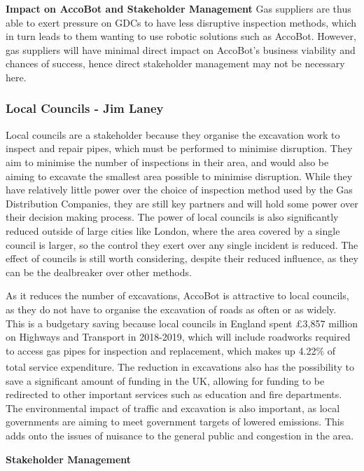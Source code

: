 \documentclass[11pt]{article}		%
\newcommand{\supercite}[1]{\textsuperscript{\cite{#1}}}		%
\begin{document}
		\textbf{Impact on AccoBot and Stakeholder Management}
		Gas suppliers are thus able to exert pressure on GDCs to have less disruptive inspection methods, which in turn leads to them wanting to use robotic solutions such as AccoBot. However, gas suppliers will have minimal direct impact on AccoBot’s business viability and chances of success, hence direct stakeholder management may not be necessary here. 
		
		\subsubsection[Local Councils]{Local Councils - Jim Laney}
			
			Local councils are a stakeholder because they organise the excavation work to inspect and repair pipes, which must be performed to minimise disruption.
			They aim to minimise the number of inspections in their area, and would also be aiming to excavate the smallest area possible to minimise disruption.
			While they have relatively little power over the choice of inspection method used by the Gas Distribution Companies, they are still key partners and will hold some power over their decision making process.
			The power of local councils is also significantly reduced outside of large cities like London, where the area covered by a single council is larger, so the control they exert over any single incident is reduced.
			The effect of councils is still worth considering, despite their reduced influence, as they can be the dealbreaker over other methods.
			
			As it reduces the number of excavations, AccoBot is attractive to local councils, as they do not have to organise the excavation of roads as often or as widely.
			This is a budgetary saving because local councils in England spent £3,857 million on Highways and Transport in 2018-2019, which will include roadworks required to access gas pipes for inspection and replacement, which makes up 4.22\% of total service expenditure\supercite{ministry2020local}.
			The reduction in excavations also has the possibility to save a significant amount of funding in the UK, allowing for funding to be redirected to other important services such as education and fire departments.
			The environmental impact of traffic and excavation is also important, as local governments are aiming to meet government targets of lowered emissions.
			This adds onto the issues of nuisance to the general public and congestion in the area.
			 
		    \textbf{Stakeholder Management}
		    
\end{document}
